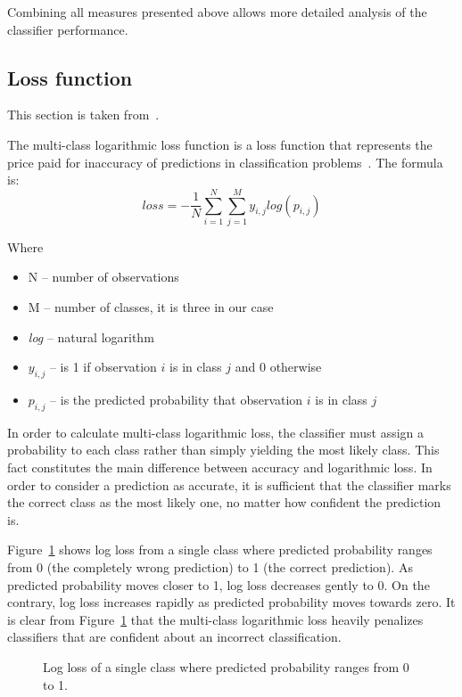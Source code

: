 \documentclass[a4paper, 11pt, table]{article}
\begin{document}
Combining all measures presented above allows more detailed analysis of the classifier performance. 

\subsection{Loss function}
\label{sec:loss_function}
This section is taken from~\cite{mlprojectreport}.

The multi-class logarithmic loss function is a loss function that represents the price paid for inaccuracy of predictions in classification problems~\cite{rosasco}. The formula is:
\begin{equation}
loss = -\frac{1}{N} \sum_{i=1}^{N} \sum_{j=1}^{M} y_{i,j} log(p_{i,j})
\end{equation}

Where 
\begin{itemize}
\item N -- number of observations
\item M -- number of classes, it is three in our case
\item \textit{log} -- natural logarithm
\item $y_{i,j}$ -- is 1 if observation $i$ is in class $j$ and 0 otherwise
\item $p_{i,j}$ --  is the predicted probability that observation $i$ is in class $j$
\end{itemize}

In order to calculate multi-class logarithmic loss, the classifier must assign a probability to each class rather than simply yielding the most likely class. This fact constitutes the main difference between accuracy and logarithmic loss. In order to consider a prediction as accurate, it is sufficient that the classifier marks the correct class as the most likely one, no matter how confident the prediction is.

Figure~\ref{fig:logloss} shows log loss from a single class where predicted probability ranges from 0 (the completely wrong prediction) to 1 (the correct prediction). As predicted probability moves closer to 1, log loss decreases gently to 0. On the contrary, log loss increases rapidly as predicted probability moves towards zero. It is clear from Figure~\ref{fig:logloss} that the multi-class logarithmic loss heavily penalizes classifiers that are confident about an incorrect classification.

\begin{figure}[H]
\centering
{}
\caption{\label{fig:logloss} Log loss of a single class where predicted probability ranges from 0 to 1. }
\end{figure}
\end{document}
